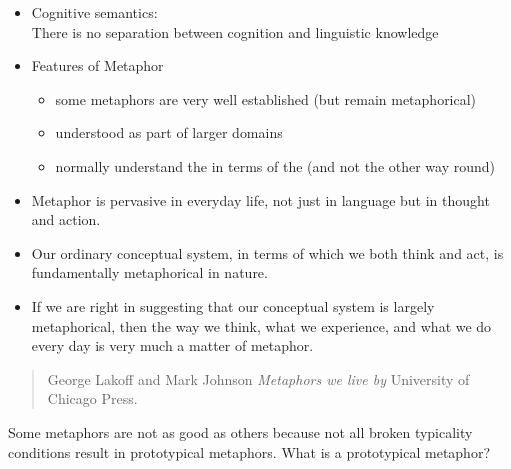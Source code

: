 \documentclass[headrule,footrule]{foils}
\begin{document}
\begin{itemize}
\item Cognitive semantics:
\\ There is no separation between cognition and
linguistic knowledge
\item Features of Metaphor
\begin{itemize}
\item {} some metaphors are very well established (but
  remain metaphorical)
\item {} understood as part of larger domains
\item {} normally understand the  
  in terms of the  (and not the other way round)
\end{itemize}

\end{itemize}



\begin{itemize}
\item Metaphor is pervasive in everyday life, not just in
language but in thought and action.
\item Our ordinary conceptual system, in terms of which we
both think and act, is fundamentally metaphorical in
nature.
\item If we are right in suggesting that our conceptual system
is largely metaphorical, then the way we think, what we
experience, and what we do every day is very much a
matter of metaphor.
\end{itemize}

\begin{quote}
  George Lakoff and Mark Johnson \citeyear{Lakoff:Johnson:1980} \textit{Metaphors we live by} 
  University of Chicago Press.
\end{quote}




Some metaphors are not as good as others because not all broken typicality
conditions result in prototypical metaphors. What is a prototypical
metaphor?
\end{document}
